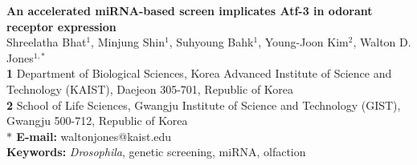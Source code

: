 \begin{flushleft}
{\Large
\textbf{An accelerated miRNA-based screen implicates Atf-3 in odorant receptor
expression}
}
\\
Shreelatha Bhat$^{1}$, 
Minjung Shin$^{1}$, 
Suhyoung Bahk$^{1}$, 
Young-Joon Kim$^{2}$, 
Walton D. Jones$^{1,\ast}$
\\
{\bf 1} Department of Biological Sciences, Korea Advanced Institute of Science and Technology (KAIST), Daejeon 305-701, Republic of Korea
\\
{\bf 2} School of Life Sciences, Gwangju Institute of Science and Technology (GIST), Gwangju 500-712, Republic of Korea
\\
{\bf $\ast$ E-mail:} waltonjones@kaist.edu
\\
{\bf Keywords:} \emph{Drosophila}, genetic screening, miRNA, olfaction
\end{flushleft}